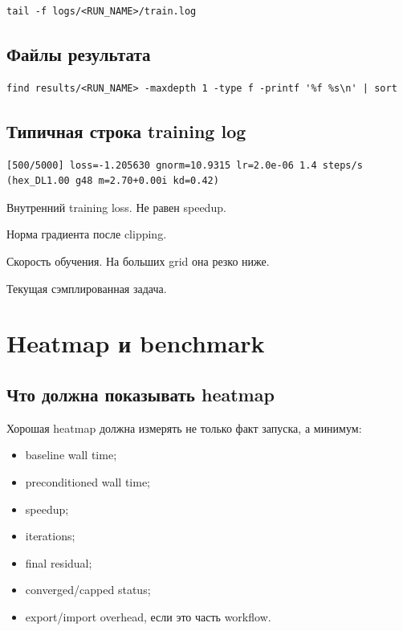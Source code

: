 \documentclass[11pt,a4paper,oneside]{book}
\newcommand{\code}[1]{\texttt{\detokenize{#1}}}
\begin{document}
\begin{lstlisting}
tail -f logs/<RUN_NAME>/train.log
\end{lstlisting}

\section{Файлы результата}

\begin{lstlisting}
find results/<RUN_NAME> -maxdepth 1 -type f -printf '%f %s\n' | sort
\end{lstlisting}

\section{Типичная строка training log}

\begin{lstlisting}
[500/5000] loss=-1.205630 gnorm=10.9315 lr=2.0e-06 1.4 steps/s (hex_DL1.00 g48 m=2.70+0.00i kd=0.42)
\end{lstlisting}

\begin{description}[leftmargin=3.2cm,style=nextline]
  \item[\code{loss}]
  Внутренний training loss. Не равен speedup.

  \item[\code{gnorm}]
  Норма градиента после clipping.

  \item[\code{steps/s}]
  Скорость обучения. На больших grid она резко ниже.

  \item[\code{hex_DL1.00 g48}]
  Текущая сэмплированная задача.
\end{description}

\chapter{Heatmap и benchmark}

\section{Что должна показывать heatmap}

Хорошая heatmap должна измерять не только факт запуска, а минимум:

\begin{itemize}[leftmargin=2em]
  \item baseline wall time;
  \item preconditioned wall time;
  \item speedup;
  \item iterations;
  \item final residual;
  \item converged/capped status;
  \item export/import overhead, если это часть workflow.
\end{itemize}
\end{document}
